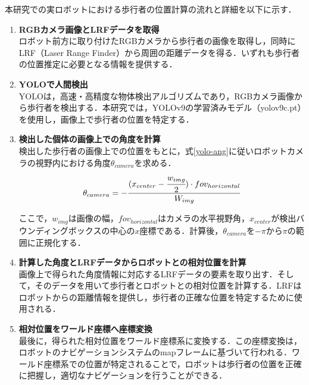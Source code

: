 \newpage

本研究での実ロボットにおける歩行者の位置計算の流れと詳細を以下に示す．

\begin{enumerate}
  \item \textbf{RGBカメラ画像とLRFデータを取得} \\
  ロボット前方に取り付けたRGBカメラから歩行者の画像を取得し，同時にLRF（Laser Range Finder）から周囲の距離データを得る．いずれも歩行者の位置推定に必要となる情報を提供する．

  \item \textbf{YOLOで人間検出} \\
  YOLO\cite{redmon2016you-yolo}は，高速・高精度な物体検出アルゴリズムであり，RGBカメラ画像から歩行者を検出する．本研究では，YOLOv9\cite{wang2025yolov9}の学習済みモデル（yolov9c.pt）を使用し，画像上で歩行者の位置を特定する．

  \item \textbf{検出した個体の画像上での角度を計算} \\
  検出した歩行者の画像上での位置をもとに，式\eqref{yolo-ang}に従いロボットカメラの視野内における角度$\theta_{camera}$を求める．
  \begin{equation}
    \theta_{camera} = - \cfrac{(x_{center} - \cfrac{w_{img}}{2}) \cdot fov_{horizontal}}{W_{img}} \label{yolo-ang}
  \end{equation}

  ここで，$w_{img}$は画像の幅，$fov_{horizontal}$はカメラの水平視野角，$x_{center}$が検出バウンディングボックスの中心の$x$座標である．計算後，$\theta_{camera}$を$-\pi \text{から} \pi$の範囲に正規化する．

  \item \textbf{計算した角度とLRFデータからロボットとの相対位置を計算} \\
  画像上で得られた角度情報に対応するLRFデータの要素を取り出す．そして，そのデータを用いて歩行者とロボットとの相対位置を計算する．LRFはロボットからの距離情報を提供し，歩行者の正確な位置を特定するために使用される．

  \item \textbf{相対位置をワールド座標へ座標変換} \\
  最後に，得られた相対位置をワールド座標系に変換する．この座標変換は，ロボットのナビゲーションシステムのmapフレームに基づいて行われる．ワールド座標系での位置が特定されることで，ロボットは歩行者の位置を正確に把握し，適切なナビゲーションを行うことができる．
\end{enumerate}

